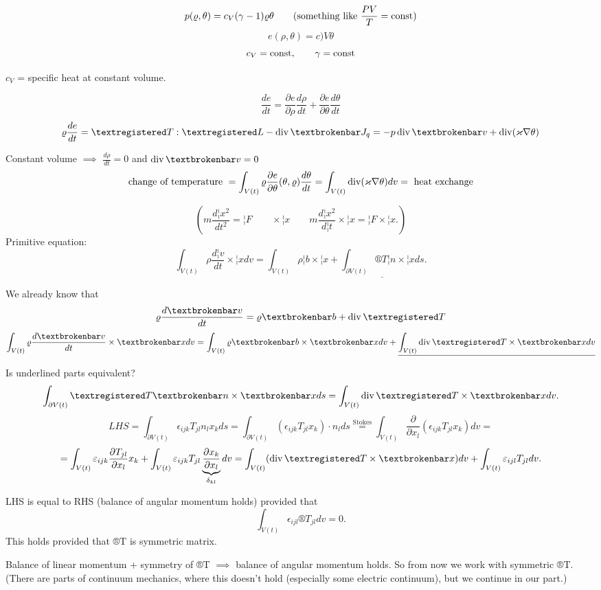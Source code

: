 \documentclass[12pt]{article}					%
\begin{document}
\begin{poznamka}
	$$ p(\varrho, \theta) = c_V(\gamma - 1)\varrho\theta \qquad (\text{something like } \frac{PV}{T} = \operatorname{const}) $$
	$$ e(\rho, \theta) = c)V \theta $$
	$$ c_V = \operatorname{const}, \qquad \gamma = \operatorname{const} $$

	$c_V$ = specific heat at constant volume.

	\begin{poznamkain}[$c_V$]
		$$ \frac{de}{dt} = \frac{\partial e}{\partial \rho} \frac{d\rho}{dt} + \frac{\partial e}{\partial \theta} \frac{d\theta}{dt} $$
		$$ \rho \frac{de}{dt} = ®T:®L - \Div ¦J_q = -p \Div ¦v + \Div(\kappa \nabla \theta) $$

		Constant volume $\implies$ $\frac{d\rho}{dt} = 0$ and $\Div ¦v = 0$
		$$ \text{change of temperature } = \int_{V(t)} \varrho \frac{\partial e}{\partial \theta}(\theta, \varrho) \frac{d\theta}{dt} = \int_{V(t)} \operatorname{div}(\varkappa \nabla \theta) dv = \text{ heat exchange} $$
	\end{poznamkain}
\end{poznamka}


\begin{poznamka}
	$$ (m \frac{d¦x^2}{dt^2} = ¦F \qquad \times ¦x \qquad m \frac{d¦x^2}{d¦t} \times ¦x = ¦F \times ¦x.) $$
	Primitive equation:
	$$ \int_{V(t)} \rho \frac{d ¦v}{d t} \times ¦x dv = \int_{V(t)} \rho ¦b \times ¦x + \underline{\int_{\partial V(t)} ®T ¦n \times ¦x ds}. $$

	We already know that
	$$ \rho \frac{d¦v}{dt} = \rho ¦b + \Div ®T $$
	$$ \int_{V(t)} \rho \frac{d¦v}{dt} \times ¦x dv = \int_{V(t)} \rho ¦b \times ¦x dv + \underline{\int_{V(t)} \Div ®T \times ¦x dv} $$

	Is underlined parts equivalent?
	$$ \int_{\partial V(t)} ®T ¦n \times ¦x ds = \int_{V(t)} \Div ®T \times ¦x dv. $$
	$$ LHS = \int_{\partial V(t)} \epsilon_{ijk} T_{jl} n_l x_k ds = \int_{\partial V(t)}(\epsilon_{ijk} T_{jl} x_k)·n_l ds \overset{\text{Stokes}}= \int_{V(t)} \frac{\partial}{\partial x_l}(\epsilon_{ijk} T_{jl} x_k)dv =  $$
	$$ = \int_{V(t)} \epsilon_{ijk} \frac{\partial T_{jl}}{\partial x_l} x_k + \int_{V(t)} \epsilon_{ijk} T_{jl} \underbrace{\frac{\partial x_k}{\partial x_l}}_{\delta_{kl}} dv = \int_{V(t)} (\Div ®T \times ¦x) dv + \int_{V(t)} \epsilon_{ijl} T_{jl} dv. $$

	LHS is equal to RHS (balance of angular momentum holds) provided that
	$$ \int_{V(t)} \epsilon_{ijl} ®T_{jl} dv = 0. $$
	This holds provided that ®T is symmetric matrix.

	Balance of linear momentum + symmetry of ®T $\implies$ balance of angular momentum holds. So from now we work with symmetric ®T. (There are parts of continuum mechanics, where this doesn't hold (especially some electric continuum), but we continue in our part.)
\end{poznamka}
\end{document}
